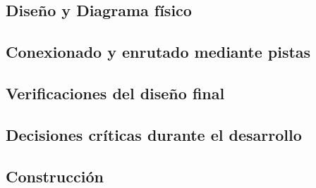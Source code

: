     
\subsection{Diseño y Diagrama físico}

\subsection{Conexionado y enrutado mediante pistas}

\subsection{Verificaciones del diseño final}

\subsection{Decisiones críticas durante el desarrollo}

\subsection{Construcción}

